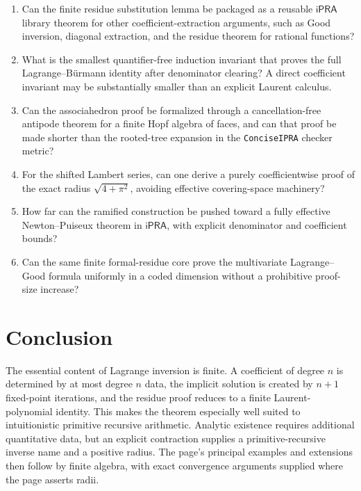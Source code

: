 \documentclass[11pt]{article}
\theoremstyle{definition}
\newcommand{\ipra}{\mathsf{iPRA}}
\newcommand{\code}[1]{\texttt{#1}}
\begin{document}
\begin{enumerate}
\item Can the finite residue substitution lemma be packaged as a reusable
\(\ipra\) library theorem for other coefficient-extraction arguments, such as
Good inversion, diagonal extraction, and the residue theorem for rational
functions?
\item What is the smallest quantifier-free induction invariant that proves the
full Lagrange--B\"urmann identity after denominator clearing?  A direct
coefficient invariant may be substantially smaller than an explicit Laurent
calculus.
\item Can the associahedron proof be formalized through a cancellation-free
antipode theorem for a finite Hopf algebra of faces, and can that proof be made
shorter than the rooted-tree expansion in the \code{ConciseIPRA} checker
metric?
\item For the shifted Lambert series, can one derive a purely coefficientwise
proof of the exact radius \(\sqrt{4+\pi^2}\), avoiding effective covering-space
machinery?
\item How far can the ramified construction be pushed toward a fully effective
Newton--Puiseux theorem in \(\ipra\), with explicit denominator and coefficient
bounds?
\item Can the same finite formal-residue core prove the multivariate
Lagrange--Good formula uniformly in a coded dimension without a prohibitive
proof-size increase?
\end{enumerate}

\section{Conclusion}

The essential content of Lagrange inversion is finite.  A coefficient of degree
\(n\) is determined by at most degree \(n\) data, the implicit solution is
created by \(n+1\) fixed-point iterations, and the residue proof reduces to a
finite Laurent-polynomial identity.  This makes the theorem especially well
suited to intuitionistic primitive recursive arithmetic.  Analytic existence
requires additional quantitative data, but an explicit contraction supplies a
primitive-recursive inverse name and a positive radius.  The page's principal
examples and extensions then follow by finite algebra, with exact convergence
arguments supplied where the page asserts radii.
\end{document}
